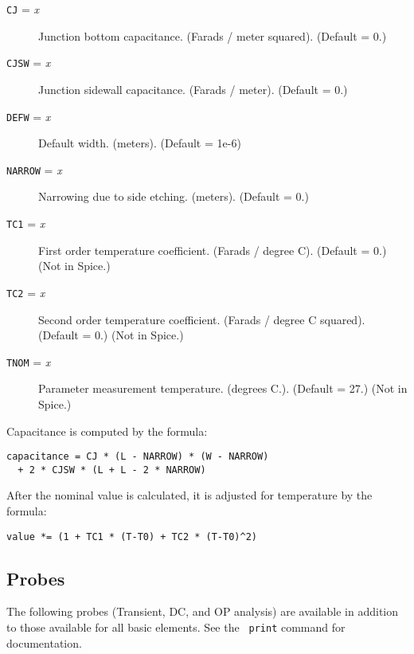 \begin{description}
  
\item[{\tt CJ} = {\it x}] Junction bottom capacitance. (Farads / meter
  squared).  (Default = 0.)
  
\item[{\tt CJSW} = {\it x}] Junction sidewall capacitance. (Farads /
  meter).  (Default = 0.)
  
\item[{\tt DEFW} = {\it x}] Default width. (meters).  (Default = 1e-6)
  
\item[{\tt NARROW} = {\it x}] Narrowing due to side etching. (meters).
  (Default = 0.)
  
\item[{\tt TC1} = {\it x}] First order temperature coefficient.
  (Farads / degree C).  (Default = 0.) (Not in Spice.)
  
\item[{\tt TC2} = {\it x}] Second order temperature coefficient.
  (Farads / degree C squared).  (Default = 0.) (Not in Spice.)
  
\item[{\tt TNOM} = {\it x}] Parameter measurement temperature.
  (degrees C.).  (Default = 27.) (Not in Spice.)

\end{description}

Capacitance is computed by the formula:

\begin{verbatim}
capacitance = CJ * (L - NARROW) * (W - NARROW)
  + 2 * CJSW * (L + L - 2 * NARROW)
\end{verbatim}

After the nominal value is calculated, it is adjusted for temperature
by the formula:

\begin{verbatim}
value *= (1 + TC1 * (T-T0) + TC2 * (T-T0)^2)
\end{verbatim}
\subsection{Probes}

The following probes (Transient, DC, and OP analysis) are available in
addition to those available for all basic elements.  See the {\tt
print} command for documentation.

